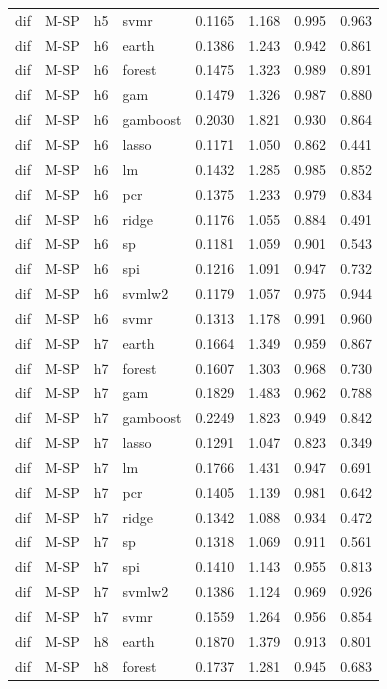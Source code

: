\begin{ThreePartTable}
\begin{longtable}[t]{llclcccc}
dif & M-SP & h5 & svmr & 0.1165 & 1.168 & 0.995 & 0.963\\
\addlinespace
dif & M-SP & h6 & earth & 0.1386 & 1.243 & 0.942 & 0.861\\
dif & M-SP & h6 & forest & 0.1475 & 1.323 & 0.989 & 0.891\\
dif & M-SP & h6 & gam & 0.1479 & 1.326 & 0.987 & 0.880\\
dif & M-SP & h6 & gamboost & 0.2030 & 1.821 & 0.930 & 0.864\\
dif & M-SP & h6 & lasso & 0.1171 & 1.050 & 0.862 & 0.441\\
dif & M-SP & h6 & lm & 0.1432 & 1.285 & 0.985 & 0.852\\
dif & M-SP & h6 & pcr & 0.1375 & 1.233 & 0.979 & 0.834\\
dif & M-SP & h6 & ridge & 0.1176 & 1.055 & 0.884 & 0.491\\
dif & M-SP & h6 & sp & 0.1181 & 1.059 & 0.901 & 0.543\\
dif & M-SP & h6 & spi & 0.1216 & 1.091 & 0.947 & 0.732\\
dif & M-SP & h6 & svmlw2 & 0.1179 & 1.057 & 0.975 & 0.944\\
dif & M-SP & h6 & svmr & 0.1313 & 1.178 & 0.991 & 0.960\\
\addlinespace
dif & M-SP & h7 & earth & 0.1664 & 1.349 & 0.959 & 0.867\\
dif & M-SP & h7 & forest & 0.1607 & 1.303 & 0.968 & 0.730\\
dif & M-SP & h7 & gam & 0.1829 & 1.483 & 0.962 & 0.788\\
dif & M-SP & h7 & gamboost & 0.2249 & 1.823 & 0.949 & 0.842\\
dif & M-SP & h7 & lasso & 0.1291 & 1.047 & 0.823 & 0.349\\
dif & M-SP & h7 & lm & 0.1766 & 1.431 & 0.947 & 0.691\\
dif & M-SP & h7 & pcr & 0.1405 & 1.139 & 0.981 & 0.642\\
dif & M-SP & h7 & ridge & 0.1342 & 1.088 & 0.934 & 0.472\\
dif & M-SP & h7 & sp & 0.1318 & 1.069 & 0.911 & 0.561\\
dif & M-SP & h7 & spi & 0.1410 & 1.143 & 0.955 & 0.813\\
dif & M-SP & h7 & svmlw2 & 0.1386 & 1.124 & 0.969 & 0.926\\
dif & M-SP & h7 & svmr & 0.1559 & 1.264 & 0.956 & 0.854\\
\addlinespace
dif & M-SP & h8 & earth & 0.1870 & 1.379 & 0.913 & 0.801\\
dif & M-SP & h8 & forest & 0.1737 & 1.281 & 0.945 & 0.683\\

\end{longtable}
\end{ThreePartTable}
